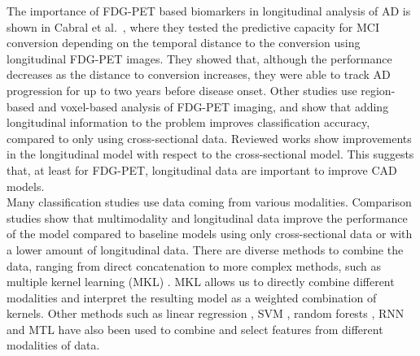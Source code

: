 The importance of FDG-PET based biomarkers in longitudinal analysis of AD is shown in Cabral et al.\ \cite{Cabral2015}, where they tested the predictive capacity for MCI conversion depending on the temporal distance to the conversion using longitudinal FDG-PET images. They showed that, although the performance decreases as the distance to conversion increases, they were able to track AD progression for up to two years before disease onset. Other studies use region-based \cite{Chen2011b,Gray2012} and voxel-based \cite{Rodrigues2014} analysis of FDG-PET imaging, and show that adding longitudinal information to the problem improves classification accuracy, compared to only using cross-sectional data. Reviewed works show improvements in the longitudinal model with respect to the cross-sectional model. This suggests that, at least for FDG-PET, longitudinal data are important to improve CAD models.\\

Many classification studies use data coming from various modalities. Comparison studies \cite{Hinrichs2011,Mubeen2017,Zhang2012a} show that multimodality and longitudinal data improve the performance of the model compared to baseline models using only cross-sectional data or with a lower amount of longitudinal data. There are diverse methods to combine the data, ranging from direct concatenation \cite{Aghili2018} to more complex methods, such as multiple kernel learning (MKL) \cite{Gonen2011}. MKL allows us to directly combine different modalities and interpret the resulting model as a weighted combination of kernels. Other methods such as linear regression \cite{Minhas2016}, SVM \cite{Minhas2018}, random forests \cite{Ardekani2016,Mubeen2017}, RNN \cite{Aghili2018} and MTL \cite{Thung2018} have also been used to combine and select features from different modalities of data.  \\

